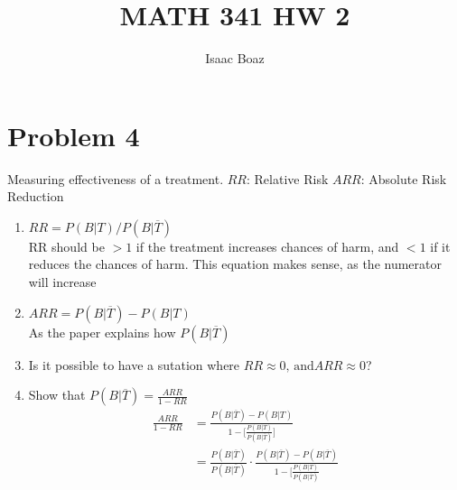 \documentclass{article}
\title{\vspace{-5ex}MATH 341 HW 2}
\author{Isaac Boaz}
\begin{document}
\maketitle

\section*{Problem 4}
Measuring effectiveness of a treatment.
\(RR\): Relative Risk
\(ARR\): Absolute Risk Reduction

\begin{enumerate}[label=\alph*)]
    \item \(RR = P(B \vert T) / P(B \vert \overline{T})\) \\
    RR should be \(> 1\) if the treatment increases chances of harm, and \(< 1\) if it reduces the chances of harm.
    This equation makes sense, as the numerator will increase 
    \item \(ARR = P(B \vert \overline{T}) - P(B \vert T)\) \\
    As the paper explains how \(P(B \vert \overline{T})\) 
    \item Is it possible to have a sutation where \(RR \approx 0 \text{, and} ARR \approx 0\)?
    \item Show that \(P(B \vert \overline{T}) = \frac{ARR}{1-RR}\) \\
    \begin{align*}
        \frac{ARR}{1-RR} &= \frac{P(B \vert \overline{T}) - P(B \vert T)}{1 - \lbrack \frac{P (B \vert T)}{P(B \vert \overline{T})} \rbrack} \\
        &= \frac{P(B \vert \overline{T})}{P(B \vert \overline{T})} \cdot \frac{P(B \vert \overline{T}) - P(B \vert \overline{T})}{ 1 - \lbrack \frac{P (B \vert T)}{P (B \vert \overline{T})}}
    \end{align*}
\end{enumerate}
\end{document}

